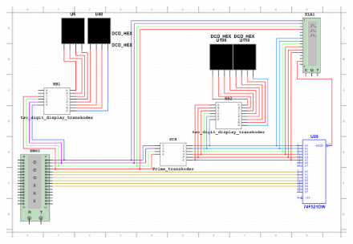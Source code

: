 \documentclass[a4paper]{article}
\begin{document}
\begin{figure}[H]
  \centering
  \includegraphics[width=\linewidth]{schemat.png}
 \end{figure}
\end{document}
